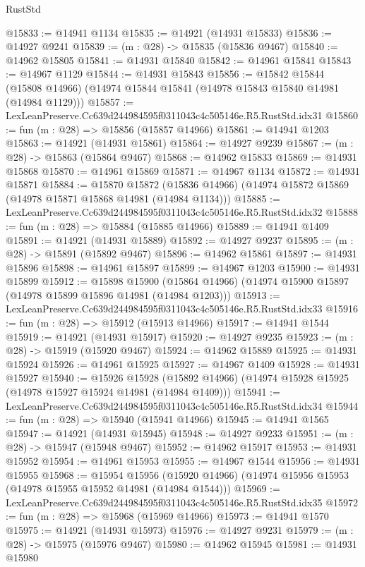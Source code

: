 \begin{lexlean}{RustStd}
\begin{coremodule}
@15833 := @14941 @1134
@15835 := @14921 (@14931 @15833)
@15836 := @14927 @9241
@15839 := (m : @28) -> @15835 (@15836 @9467)
@15840 := @14962 @15805
@15841 := @14931 @15840
@15842 := @14961 @15841
@15843 := @14967 @1129
@15844 := @14931 @15843
@15856 := @15842
    @15844
    (@15808 @14966)
    (@14974 @15844 @15841 (@14978 @15843 @15840 @14981 (@14984 @1129)))
@15857 := LexLeanPreserve.Cc639d244984595f0311043c4c505146e.R5.RustStd.idx31
@15860 := fun (m : @28) => @15856 (@15857 @14966)
@15861 := @14941 @1203
@15863 := @14921 (@14931 @15861)
@15864 := @14927 @9239
@15867 := (m : @28) -> @15863 (@15864 @9467)
@15868 := @14962 @15833
@15869 := @14931 @15868
@15870 := @14961 @15869
@15871 := @14967 @1134
@15872 := @14931 @15871
@15884 := @15870
    @15872
    (@15836 @14966)
    (@14974 @15872 @15869 (@14978 @15871 @15868 @14981 (@14984 @1134)))
@15885 := LexLeanPreserve.Cc639d244984595f0311043c4c505146e.R5.RustStd.idx32
@15888 := fun (m : @28) => @15884 (@15885 @14966)
@15889 := @14941 @1409
@15891 := @14921 (@14931 @15889)
@15892 := @14927 @9237
@15895 := (m : @28) -> @15891 (@15892 @9467)
@15896 := @14962 @15861
@15897 := @14931 @15896
@15898 := @14961 @15897
@15899 := @14967 @1203
@15900 := @14931 @15899
@15912 := @15898
    @15900
    (@15864 @14966)
    (@14974 @15900 @15897 (@14978 @15899 @15896 @14981 (@14984 @1203)))
@15913 := LexLeanPreserve.Cc639d244984595f0311043c4c505146e.R5.RustStd.idx33
@15916 := fun (m : @28) => @15912 (@15913 @14966)
@15917 := @14941 @1544
@15919 := @14921 (@14931 @15917)
@15920 := @14927 @9235
@15923 := (m : @28) -> @15919 (@15920 @9467)
@15924 := @14962 @15889
@15925 := @14931 @15924
@15926 := @14961 @15925
@15927 := @14967 @1409
@15928 := @14931 @15927
@15940 := @15926
    @15928
    (@15892 @14966)
    (@14974 @15928 @15925 (@14978 @15927 @15924 @14981 (@14984 @1409)))
@15941 := LexLeanPreserve.Cc639d244984595f0311043c4c505146e.R5.RustStd.idx34
@15944 := fun (m : @28) => @15940 (@15941 @14966)
@15945 := @14941 @1565
@15947 := @14921 (@14931 @15945)
@15948 := @14927 @9233
@15951 := (m : @28) -> @15947 (@15948 @9467)
@15952 := @14962 @15917
@15953 := @14931 @15952
@15954 := @14961 @15953
@15955 := @14967 @1544
@15956 := @14931 @15955
@15968 := @15954
    @15956
    (@15920 @14966)
    (@14974 @15956 @15953 (@14978 @15955 @15952 @14981 (@14984 @1544)))
@15969 := LexLeanPreserve.Cc639d244984595f0311043c4c505146e.R5.RustStd.idx35
@15972 := fun (m : @28) => @15968 (@15969 @14966)
@15973 := @14941 @1570
@15975 := @14921 (@14931 @15973)
@15976 := @14927 @9231
@15979 := (m : @28) -> @15975 (@15976 @9467)
@15980 := @14962 @15945
@15981 := @14931 @15980

\end{coremodule}
\end{lexlean}
